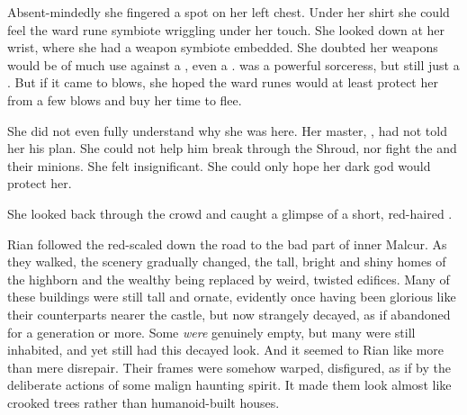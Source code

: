 Absent-mindedly she fingered a spot on her left chest. 
Under her shirt she could feel the ward rune symbiote wriggling under her touch. 
She looked down at her wrist, where she had a weapon symbiote embedded. 
She doubted her weapons would be of much use against a \resphan, even a \bezed. 
\Criseis was a powerful sorceress, but still just a \scatha.
But if it came to blows, she hoped the ward runes would at least protect her from a few blows and buy her time to flee. 

She did not even fully understand why she was here. 
Her master, \QuessanthIshnaruchaefir, had not told her his plan. 
She could not help him break through the Shroud, nor fight the \resphain and their minions. 
She felt insignificant. 
She could only hope her dark god would protect her. 

She looked back through the crowd and caught a glimpse of a short, red-haired \human.



\begin{comment}
  \subsection{Rian follows Criseis}
\end{comment}
\new
Rian followed the red-scaled \sphyle down the road to the bad part of inner Malcur. 
As they walked, the scenery gradually changed, the tall, bright and shiny homes of the highborn and the wealthy being replaced by weird, twisted edifices. Many of these buildings were still tall and ornate, evidently once having been glorious like their counterparts nearer the castle, but now strangely decayed, as if abandoned for a generation or more. 
Some \emph{were} genuinely empty, but many were still inhabited, and yet still had this decayed look. 
And it seemed to Rian like more than mere disrepair. Their frames were somehow warped, disfigured, as if by the deliberate actions of some malign haunting spirit. It made them look almost like crooked trees rather than humanoid-built houses. 

